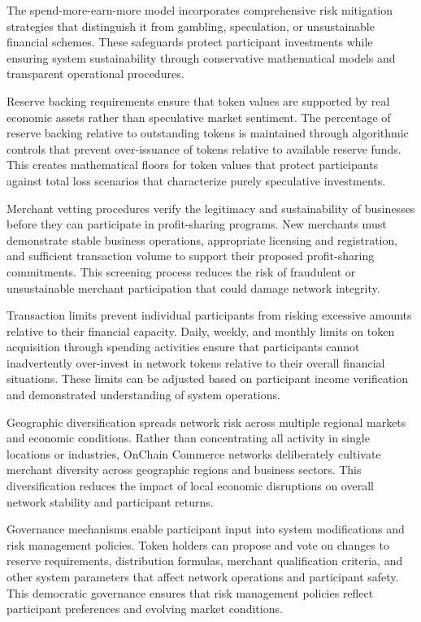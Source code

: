 \documentclass[
  Letterpaper,
]{scrbook}
\begin{document}
The spend-more-earn-more model incorporates comprehensive risk
mitigation strategies that distinguish it from gambling, speculation, or
unsustainable financial schemes. These safeguards protect participant
investments while ensuring system sustainability through conservative
mathematical models and transparent operational procedures.

Reserve backing requirements ensure that token values are supported by
real economic assets rather than speculative market sentiment. The
percentage of reserve backing relative to outstanding tokens is
maintained through algorithmic controls that prevent over-issuance of
tokens relative to available reserve funds. This creates mathematical
floors for token values that protect participants against total loss
scenarios that characterize purely speculative investments.

Merchant vetting procedures verify the legitimacy and sustainability of
businesses before they can participate in profit-sharing programs. New
merchants must demonstrate stable business operations, appropriate
licensing and registration, and sufficient transaction volume to support
their proposed profit-sharing commitments. This screening process
reduces the risk of fraudulent or unsustainable merchant participation
that could damage network integrity.

Transaction limits prevent individual participants from risking
excessive amounts relative to their financial capacity. Daily, weekly,
and monthly limits on token acquisition through spending activities
ensure that participants cannot inadvertently over-invest in network
tokens relative to their overall financial situations. These limits can
be adjusted based on participant income verification and demonstrated
understanding of system operations.

Geographic diversification spreads network risk across multiple regional
markets and economic conditions. Rather than concentrating all activity
in single locations or industries, OnChain Commerce networks
deliberately cultivate merchant diversity across geographic regions and
business sectors. This diversification reduces the impact of local
economic disruptions on overall network stability and participant
returns.

Governance mechanisms enable participant input into system modifications
and risk management policies. Token holders can propose and vote on
changes to reserve requirements, distribution formulas, merchant
qualification criteria, and other system parameters that affect network
operations and participant safety. This democratic governance ensures
that risk management policies reflect participant preferences and
evolving market conditions.
\end{document}
